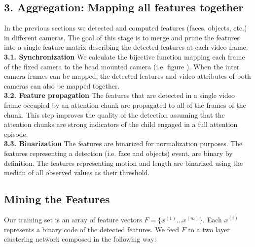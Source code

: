 \documentclass[10pt,letterpaper]{article}
\begin{document}
\subsection{3. Aggregation: Mapping all features together}
In the previous sections we detected and computed features (faces, objects, etc.) in different cameras. The goal of this stage is to merge and prune the features into a single feature matrix describing the detected features at each video frame.\\

{\bf 3.1. Synchronization} We calculate the bijective function mapping each frame of the fixed camera to the head mounted camera (i.e. figure \label{fig:main} ). When the inter camera frames can be mapped, the detected features and video attributes of both cameras can also be mapped together.\\

{\bf 3.2. Feature propagation} The features that are detected in a single video frame occupied by an attention chunk are propagated to all of the frames of the chunk. This step improves the quality of the detection assuming that the attention chunks are strong indicators of the child engaged in a full attention episode.\\

{\bf 3.3. Binarization} The features are binarized for normalization purposes. The features representing a detection (i.e. face and objects) event, are binary by definition. The features representing motion and length are binarized using the median of all observed values as their threshold.\\

\subsection{Mining the Features}
Our training set is an array of feature vectors $F = \{x^{(1)} \dots x^{(m)}\}$. Each $x^{(i)}$ represents a binary code of the detected features. We feed $F$ to a two layer clustering network composed in the following way: 
\end{document}
